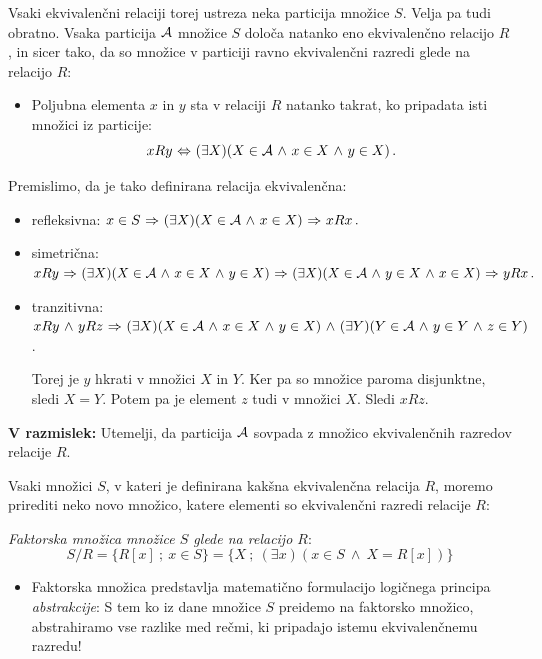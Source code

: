 \documentclass[11pt,paper=b5,footinclude,headinclude]{scrbook} %
\def\inn {{~\wedge~}}
\def\sledi {{~\Rightarrow~}}
\def\cee {{~\Leftrightarrow~}}
\begin{document}
Vsaki ekvivalenčni relaciji torej ustreza neka particija množice $S$.
Velja pa tudi obratno. Vsaka particija ${\cal A}$ množice $S$ določa natanko eno ekvivalenčno relacijo $R$, in sicer tako, da so množice v particiji ravno ekvivalenčni razredi glede na relacijo $R$:
\begin{itemize}
  \item Poljubna elementa $x$ in $y$ sta v relaciji $R$ natanko takrat, ko pripadata isti množici iz particije:
      $$xRy\cee (\exists X)(X\in {\cal A}\inn x\in X\inn y\in X)\,.$$
\end{itemize}
Premislimo, da je tako definirana relacija ekvivalenčna:
\begin{itemize}
  \item refleksivna: $x\in S \sledi (\exists X)(X\in {\cal A}\inn x\in X)\sledi xRx\,.$
  \item simetrična:
  $xRy\sledi (\exists X)(X\in {\cal A}\inn x\in X\inn y\in X)
  \sledi (\exists X)(X\in {\cal A}\inn y\in X\inn x\in X)\sledi yRx\,.$
  \item tranzitivna:
  $xRy \inn yRz\sledi (\exists X)(X\in {\cal A}\inn x\in X\inn y\in X)
  \inn (\exists Y)(Y\in {\cal A}\inn y\in Y\inn z\in Y)$.

  Torej je $y$ hkrati v množici $X$ in $Y$. Ker pa so množice paroma disjunktne, sledi
  $X = Y$. Potem pa je element $z$ tudi v množici $X$. Sledi $xRz$.
\end{itemize}

\textbf{ V razmislek:} Utemelji, da particija ${\cal A}$ sovpada z množico ekvivalenčnih razredov relacije $R$.

%
%
%
%

%
%
%
%
%
%
%
%
\medskip



Vsaki množici $S$, v kateri je definirana kakšna ekvivalenčna relacija $R$, moremo prirediti neko novo množico, katere elementi so ekvivalenčni razredi relacije $R$:

{\em Faktorska množica množice $S$ glede na relacijo $R$}:
$$S/R = \{R[x]~;~x\in S\}=\{X~;~(\exists x)(x\in S \inn X = R[x])\}$$
\begin{itemize}
  \item Faktorska množica predstavlja matematično formulacijo logičnega principa {\em abstrakcije}: S tem ko iz dane množice $S$ preidemo na faktorsko množico, abstrahiramo vse razlike med rečmi, ki pripadajo istemu ekvivalenčnemu razredu!
\end{itemize}
\end{document}

